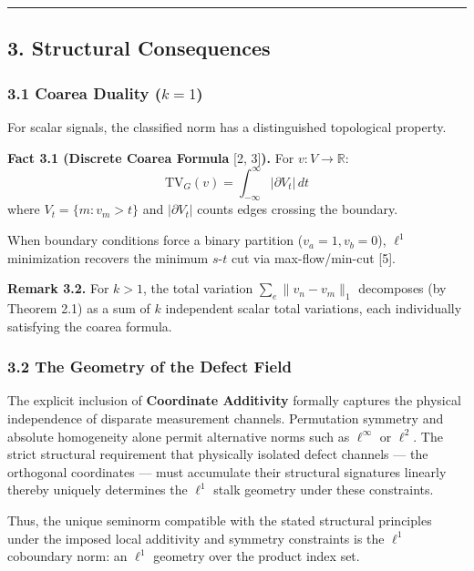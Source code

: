 \documentclass[
]{article}
\begin{document}
\begin{center}\rule{0.5\linewidth}{0.5pt}\end{center}

\subsection{3. Structural Consequences}\label{structural-consequences}

\subsubsection{\texorpdfstring{3.1 Coarea Duality
(\(k = 1\))}{3.1 Coarea Duality (k = 1)}}\label{coarea-duality-k-1}

For scalar signals, the classified norm has a distinguished topological
property.

\textbf{Fact 3.1 (Discrete Coarea Formula} {[}2, 3{]}\textbf{).} For
\(v: V \to \mathbb{R}\):
\[ \text{TV}_G(v) = \int_{-\infty}^{\infty} |\partial V_t| \, dt \]
where \(V_t = \{m : v_m > t\}\) and \(|\partial V_t|\) counts edges
crossing the boundary.

When boundary conditions force a binary partition
(\(v_a = 1, v_b = 0\)), \(\ell^1\) minimization recovers the minimum
\(s\)-\(t\) cut via max-flow/min-cut {[}5{]}.

\textbf{Remark 3.2.} For \(k > 1\), the total variation
\(\sum_e \|v_n - v_m\|_1\) decomposes (by Theorem 2.1) as a sum of \(k\)
independent scalar total variations, each individually satisfying the
coarea formula.

\subsubsection{3.2 The Geometry of the Defect
Field}\label{the-geometry-of-the-defect-field}

The explicit inclusion of \textbf{Coordinate Additivity} formally
captures the physical independence of disparate measurement channels.
Permutation symmetry and absolute homogeneity alone permit alternative
norms such as \(\ell^\infty\) or \(\ell^2\). The strict structural
requirement that physically isolated defect channels --- the orthogonal
coordinates --- must accumulate their structural signatures linearly
thereby uniquely determines the \(\ell^1\) stalk geometry under these
constraints.

Thus, the unique seminorm compatible with the stated structural
principles under the imposed local additivity and symmetry constraints
is the \(\ell^1\) coboundary norm: an \(\ell^1\) geometry over the
product index set.
\end{document}
